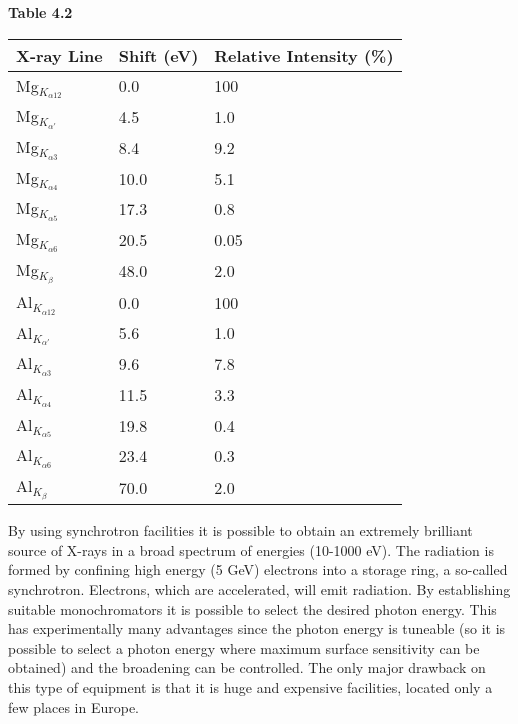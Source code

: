                                     {\bf Table 4.2}\\


             \begin{tabular} {||l|l|l||} \hline
          X-ray Line & Shift (eV) & Relative Intensity (\%)\\ \hline
          Mg$_{K_{\alpha 12}}$ & 0.0 & 100 \\ \hline Mg$_{K_{\alpha
          '}}$ & 4.5 & 1.0 \\ \hline Mg$_{K_{\alpha 3}}$ & 8.4 & 9.2 \\
          \hline Mg$_{K_{\alpha 4}}$ & 10.0 & 5.1 \\ \hline
          Mg$_{K_{\alpha 5}}$ & 17.3 & 0.8 \\ \hline Mg$_{K_{\alpha
          6}}$ & 20.5 & 0.05 \\ \hline Mg$_{K_{\beta}}$ & 48.0 & 2.0
          \\ \hline
          Al$_{K_{\alpha 12}}$ & 0.0 & 100  \\ \hline Al$_{K_{\alpha '}}$ &
          5.6 & 1.0  \\ \hline Al$_{K_{\alpha 3}}$ & 9.6 & 7.8  \\
          \hline Al$_{K_{\alpha 4}}$ & 11.5 & 3.3  \\ \hline
          Al$_{K_{\alpha 5}}$ & 19.8 & 0.4  \\ \hline Al$_{K_{\alpha
          6}}$ & 23.4 & 0.3  \\ \hline Al$_{K_{\beta}}$ & 70.0 & 2.0  \\
          \hline \end{tabular}

           \vspace{1cm}


             By using synchrotron facilities it is possible to obtain an
          extremely brilliant source of X-rays in a broad spectrum of
          energies (10-1000 eV). The radiation is formed by confining
          high energy  (5  GeV)  electrons  into  a  storage  ring,  a
          so-called synchrotron. Electrons, which are accelerated, will
          emit radiation. By establishing suitable  monochromators  it
          is possible to select the desired photon  energy.  This  has
          experimentally many advantages since the photon  energy  is
          tuneable (so it is possible to select a photon energy  where
          maximum  surface  sensitivity  can  be  obtained)  and   the
          broadening can be controlled. The  only  major  drawback  on
          this type of equipment is that  it  is  huge  and  expensive
          facilities, located only a few places in Europe.


